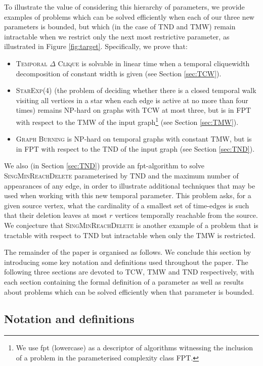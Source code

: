 \documentclass[preprint,12pt]{elsarticle}
\begin{document}
To illustrate the value of considering this hierarchy of parameters, we provide examples of problems which can be solved efficiently when each of our three new parameters is bounded, but which (in the case of TND and TMW) remain intractable when we restrict only the next most restrictive parameter, as illustrated in Figure \ref{fig:target}.  Specifically, we prove that:
\begin{itemize}
    \item \textsc{Temporal $\Delta$ Clique} is solvable in linear time when a temporal cliquewidth decomposition of constant width is given (see Section \ref{sec:TCW}).
    \item \textsc{StarExp(4)} (the problem of deciding whether there is a closed temporal walk visiting all vertices in a star when each edge is active at no more than four times) remains NP-hard on graphs with TCW at most three, but is in FPT with respect to the TMW of the input graph\footnote{We use fpt (lowercase) as a descriptor of algorithms witnessing the inclusion of a problem in the parameterised complexity class FPT.} (see Section \ref{sec:TMW}).
   \item \textsc{Graph Burning} is NP-hard on temporal graphs with constant TMW, but is in FPT with respect to the TND of the input graph (see Section \ref{sec:TND}).
\end{itemize}
We also (in Section \ref{sec:TND}) provide an fpt-algorithm to solve \textsc{SingMinReachDelete} parameterised by TND and the maximum number of appearances of any edge, in order to illustrate additional techniques that may be used when working with this new temporal parameter. This problem asks, for a given source vertex, what the cardinality of a smallest set of time-edges is such that their deletion leaves at most $r$ vertices temporally reachable from the source.  We conjecture that \textsc{SingMinReachDelete} is another example of a problem that is tractable with respect to TND but intractable when only the TMW is restricted.

The remainder of the paper is organised as follows.  We conclude this section by introducing some key notation and definitions used throughout the paper.  The following three sections are devoted to TCW, TMW and TND respectively, with each section containing the formal definition of a parameter as well as results about problems which can be solved efficiently when that parameter is bounded.  

\subsection{Notation and definitions}
\end{document}
